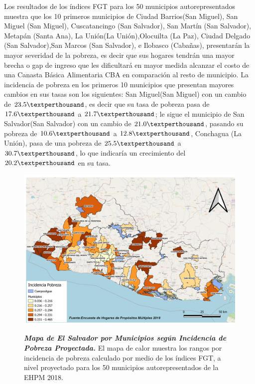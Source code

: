 \begin{table}[H]
{\begin{tabular}{lllcccccccccc}
			
			
		\end{tabular} 
		
	}
	{\small {}}
	
\end{table}

Los resultados de los índices FGT para los 50 municipios autorepresentados muestra que los 10 primeros municipios de Ciudad Barrios(San Miguel), San Miguel (San Miguel), Cuscatancingo (San Salvador), San Martín (San Salvador), Metapán (Santa Ana), La Unión(La Unión),Olocuilta (La Paz), Ciudad  Delgado (San Salvador),San Marcos (San Salvador), e Ilobasco (Cabañas), presentarán la mayor severidad de la pobreza, es decir que sus hogares tendrán una mayor brecha o gap de ingreso que les dificultará en mayor medida alcanzar el costo de una Canasta Básica Alimentaria CBA en comparación al resto de municipio. La incidencia de pobreza en los primeros 10 municipios que presentan mayores cambios en sus tasas son los siguientes: San Miguel(San Miguel) con un cambio de $23.5 \textperthousand$, es decir que su tasa de pobreza pasa de $17.6 \textperthousand$ a $21.7 \textperthousand$; le sigue el municipio de San Salvador(San Salvador) con un cambio de $21.0 \textperthousand$, pasando su pobreza de $10.6 \textperthousand$ a $12.8 \textperthousand$, Conchagua (La Unión), pasa de una pobreza de $25.5 \textperthousand$ a $30.7 \textperthousand$, lo que indicaría un crecimiento del $20.2 \textperthousand$ en su tasa. 

\begin{figure}[H]
	\centering
	\includegraphics[width=1\linewidth]{Imagenes/Incidencia2}
	\caption{\textbf{\textit{Mapa de El Salvador por Municipios según Incidencia de Pobreza Proyectada.}} {\small El mapa de calor muestra los rangos por incidencia de pobreza calculado por medio de los índices FGT, a nivel proyectado para los 50 municipios autorepresentados de la EHPM 2018.}
	} 
	\label{fig:16}
	\resizebox{20 cm}{!} { }
	
\end{figure}


